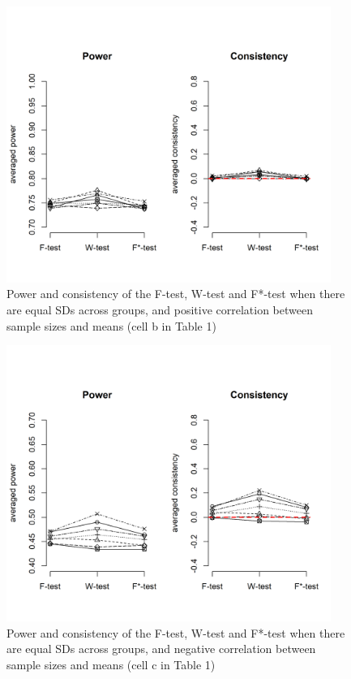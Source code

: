 \documentclass[man,floatsintext]{apa6}
\begin{document}
\begin{figure}
\includegraphics[width=400px]{Rmarkdown folder/Rmarkdown inputs/Fig2b} \caption{Power and consistency of the F-test, W-test and F*-test when there are equal SDs across groups, and positive correlation between sample sizes and means (cell b in Table 1)}\label{fig:unnamed-chunk-8}
\end{figure}

\begin{figure}
\includegraphics[width=400px]{Rmarkdown folder/Rmarkdown inputs/Fig2c} \caption{Power and consistency of the F-test, W-test and F*-test when there are equal SDs across groups, and negative correlation between sample sizes and means (cell c in Table 1)}\label{fig:unnamed-chunk-9}
\end{figure}
\end{document}

